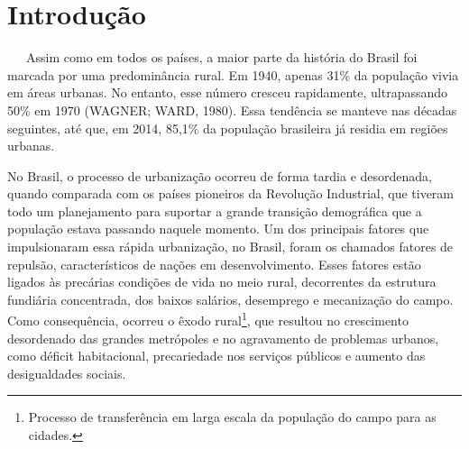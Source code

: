 \documentclass[
  12pt,
  a4paper,
]{scrreprt}
\renewcommand*\contentsname{Índice}
\newcommand\contentsname{Índice}
\renewcommand*\listfigurename{Lista de Figuras}
\newcommand\listfigurename{Lista de Figuras}
\renewcommand*\listtablename{Lista de Tabelas}
\newcommand\listtablename{Lista de Tabelas}
\begin{document}
\bgroup
\hypersetup{linkcolor = black}

\cleardoublepage
\renewcommand{\listfigurename}{\centering{Lista de Figuras}}
\listoffigures
\thispagestyle{empty}

\cleardoublepage
\renewcommand{\listtablename}{\centering{Lista de Tabelas}}
\listoftables
\thispagestyle{empty}

\cleardoublepage
\renewcommand{\listalgorithmname}{\centering{Lista de Algoritmos}}
\listofalgorithms
\thispagestyle{empty}

\cleardoublepage
\renewcommand{\contentsname}{\centering{Sumário}}
\tableofcontents
{}
\thispagestyle{empty}

\egroup

\chapter{Introdução}\label{introduuxe7uxe3o}

~~~Assim como em todos os países, a maior parte da história do Brasil
foi marcada por uma predominância rural. Em 1940, apenas 31\% da
população vivia em áreas urbanas. No entanto, esse número cresceu
rapidamente, ultrapassando 50\% em 1970 (WAGNER; WARD, 1980). Essa
tendência se manteve nas décadas seguintes, até que, em 2014, 85,1\% da
população brasileira já residia em regiões urbanas.

\vspace{12pt}

No Brasil, o processo de urbanização ocorreu de forma tardia e
desordenada, quando comparada com os países pioneiros da Revolução
Industrial, que tiveram todo um planejamento para suportar a grande
transição demográfica que a população estava passando naquele momento.
Um dos principais fatores que impulsionaram essa rápida urbanização, no
Brasil, foram os chamados fatores de repulsão, característicos de nações
em desenvolvimento. Esses fatores estão ligados às precárias condições
de vida no meio rural, decorrentes da estrutura fundiária concentrada,
dos baixos salários, desemprego e mecanização do campo. Como
consequência, ocorreu o êxodo rural\footnote{Processo de transferência
  em larga escala da população do campo para as cidades.}, que resultou
no crescimento desordenado das grandes metrópoles e no agravamento de
problemas urbanos, como déficit habitacional, precariedade nos serviços
públicos e aumento das desigualdades sociais.

\vspace{12pt}
\end{document}
